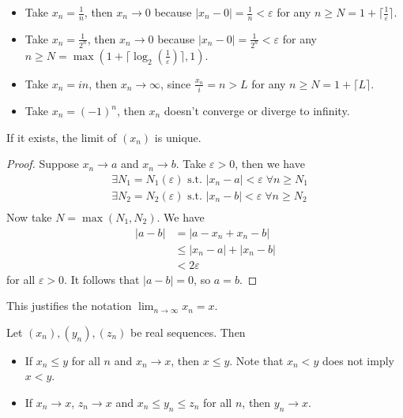 \documentclass{../template/note}
\begin{document}
    \begin{example}
        \begin{itemize}
            \item Take \(x_n = \frac{1}{n}\), then \(x_n \to 0\) because \(|x_n - 0| = \frac{1}{n} < \varepsilon\) for any \(n \geq N = 1 + \lceil \frac{1}{\varepsilon} \rceil\).
            \item Take \(x_n = \frac{1}{2^n}\), then \(x_n \to 0\) because \(|x_n - 0| = \frac{1}{2^n} < \varepsilon\) for any \(n \geq N = \max(1 + \lceil \log_2(\frac{1}{\varepsilon}) \rceil, 1)\).
            \item Take \(x_n = in\), then \(x_n \to \infty\), since \(\frac{x_n}{i} = n > L\) for any \(n \geq N = 1 + \lceil L \rceil\).
            \item Take \(x_n = (-1)^n\), then \(x_n\) doesn't converge or diverge to infinity.
        \end{itemize}
    \end{example}
    
    \begin{lemma}
        If it exists, the limit of \((x_n)\) is unique.
    \end{lemma}
    
    \begin{proof}
        Suppose \(x_n \to a\) and \(x_n \to b\). Take \(\varepsilon > 0\), then we have
        \begin{align*}
            &\exists N_1 = N_1(\varepsilon) \text{ s.t. } |x_n - a| < \varepsilon \; \forall n \geq N_1 \\
            &\exists N_2 = N_2(\varepsilon) \text{ s.t. } |x_n - b| < \varepsilon \; \forall n \geq N_2 \\
        \end{align*}
        Now take \(N = \max(N_1, N_2)\). We have
        \begin{align*}
            |a-b| &= |a-x_n+x_n-b| \\
            &\leq |x_n-a|+|x_n-b| \\
            &< 2\varepsilon
        \end{align*}
        for all \(\varepsilon > 0\). It follows that \(|a-b| = 0\), so \(a=b\).
    \end{proof}
    
    This justifies the notation \(\lim_{n \to \infty} x_n = x\).

    \begin{proposition}
        Let \((x_n), (y_n), (z_n)\) be real sequences. Then
        \begin{itemize}
            \item If \(x_n \leq y\) for all \(n\) and \(x_n \to x\), then \(x \leq y\). Note that \(x_n < y\) does not imply \(x < y\).
            \item If \(x_n \to x\), \(z_n \to x\) and \(x_n \leq y_n \leq z_n\) for all \(n\), then \(y_n \to x\).
        \end{itemize}
    \end{proposition}
    
\end{document}
